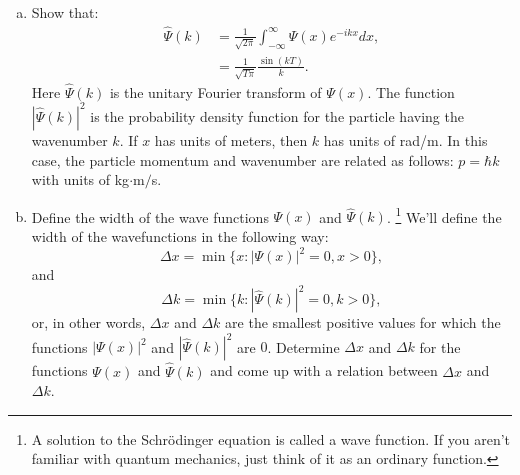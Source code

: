 \begin{enumerate}
        \begin{enumerate}[a)]
          \item Show that:
                \begin{align*}
                  \hat{\Psi}(k) & = \frac{1}{\sqrt{2\pi}}\int_{-\infty}^{\infty}\Psi(x)e^{-ik x}dx, \\
                                & = \frac{1}{\sqrt{T\pi}}\frac{\sin(k T)}{k}.
                \end{align*}
                Here $\hat{\Psi}(k)$ is the unitary Fourier transform of $\Psi(x)$. The function $|\hat{\Psi}(k)|^{2}$ is the probability
                density function for the particle having the wavenumber $k$. If $x$
                has units of meters, then $k$ has units of rad/m. In this case, the
                particle momentum and wavenumber are related as follows:
                $p = \hbar k$ with units of kg$\cdot$m$/$s.

          \item Define the width of the wave functions $\Psi(x)$ and $\hat{\Psi}(k)$.
                \footnote{A solution to the Schrödinger equation is called a wave function. 
                If you aren't familiar with quantum mechanics, just think of it as an ordinary function.}
                We'll define the width of the wavefunctions in the following way:
                \[ \Delta x = \min\{x : |\Psi(x)|^{2}=0,x>0\}, \]
                and
                \[ \Delta k = \min\{k : |\hat{\Psi}(k)|^{2}=0,k>0\}, \]
                or, in other words, $\Delta x$ and $\Delta k$ are the smallest positive values 
                for which the functions $|\Psi(x)|^{2}$ and $|\hat{\Psi}(k)|^{2}$ are $0$.
                Determine $\Delta x$ and $\Delta k$ for the functions $\Psi(x)$ and $\hat{\Psi}(k)$ 
                and come up with a relation between $\Delta x$ and $\Delta k$.


\end{enumerate}
\end{enumerate}
